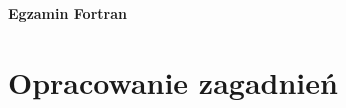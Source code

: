 \documentclass[12pt,a4paper]{article}
\begin{document}
\thispagestyle{empty}
\begin{center}
{\Large \textbf{Egzamin Fortran}}
\end{center}
\newpage
\tableofcontents
\newpage
\section{Opracowanie zagadnień}
































\newpage
\listoffigures
\renewcommand{\lstlistingname}{Kod źródłowy}
\renewcommand{\lstlistlistingname}{\lstlistingname}
\lstlistoflistings
\end{document}
